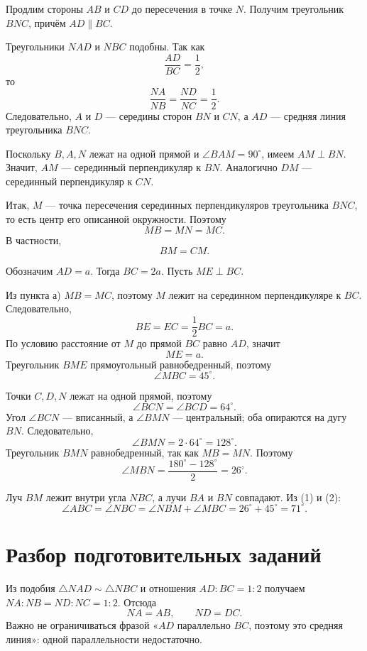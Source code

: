 \begin{answerbox}[Пункт а)]
Продлим стороны \(AB\) и \(CD\) до пересечения в точке \(N\). Получим
треугольник \(BNC\), причём \(AD\parallel BC\).

Треугольники \(NAD\) и \(NBC\) подобны. Так как
\[
\frac{AD}{BC}=\frac12,
\]
то
\[
\frac{NA}{NB}=\frac{ND}{NC}=\frac12.
\]
Следовательно, \(A\) и \(D\) — середины сторон \(BN\) и \(CN\), а \(AD\)
— средняя линия треугольника \(BNC\).

Поскольку \(B,A,N\) лежат на одной прямой и \(\angle BAM=90^\circ\),
имеем \(AM\perp BN\). Значит, \(AM\) — серединный перпендикуляр к \(BN\).
Аналогично \(DM\) — серединный перпендикуляр к \(CN\).

Итак, \(M\) — точка пересечения серединных перпендикуляров треугольника
\(BNC\), то есть центр его описанной окружности. Поэтому
\[
MB=MN=MC.
\]
В частности,
\[
\boxed{BM=CM}.
\]
\end{answerbox}

\circumcenterfigure

\newpage
\begin{answerbox}[Пункт б)]
Обозначим \(AD=a\). Тогда \(BC=2a\). Пусть \(ME\perp BC\).

Из пункта а) \(MB=MC\), поэтому \(M\) лежит на серединном перпендикуляре
к \(BC\). Следовательно,
\[
BE=EC=\frac12BC=a.
\]
По условию расстояние от \(M\) до прямой \(BC\) равно \(AD\), значит
\[
ME=a.
\]
Треугольник \(BME\) прямоугольный равнобедренный, поэтому
\[
\angle MBC=45^\circ. \tag{1}
\]

Точки \(C,D,N\) лежат на одной прямой, поэтому
\[
\angle BCN=\angle BCD=64^\circ.
\]
Угол \(\angle BCN\) — вписанный, а \(\angle BMN\) — центральный; оба
опираются на дугу \(BN\). Следовательно,
\[
\angle BMN=2\cdot64^\circ=128^\circ.
\]
Треугольник \(BMN\) равнобедренный, так как \(MB=MN\). Поэтому
\[
\angle MBN=\frac{180^\circ-128^\circ}{2}=26^\circ. \tag{2}
\]

Луч \(BM\) лежит внутри угла \(NBC\), а лучи \(BA\) и \(BN\) совпадают.
Из (1) и (2):
\[
\angle ABC=\angle NBC
=\angle NBM+\angle MBC
=26^\circ+45^\circ
=\boxed{71^\circ}.
\]
\end{answerbox}

\section{Разбор подготовительных заданий}

\begin{teacherbox}
Из подобия \(\triangle NAD\sim\triangle NBC\) и отношения \(AD:BC=1:2\)
получаем \(NA:NB=ND:NC=1:2\). Отсюда
\[
NA=AB,
\qquad
ND=DC.
\]
Важно не ограничиваться фразой «\(AD\) параллельно \(BC\), поэтому это
средняя линия»: одной параллельности недостаточно.
\end{teacherbox}

